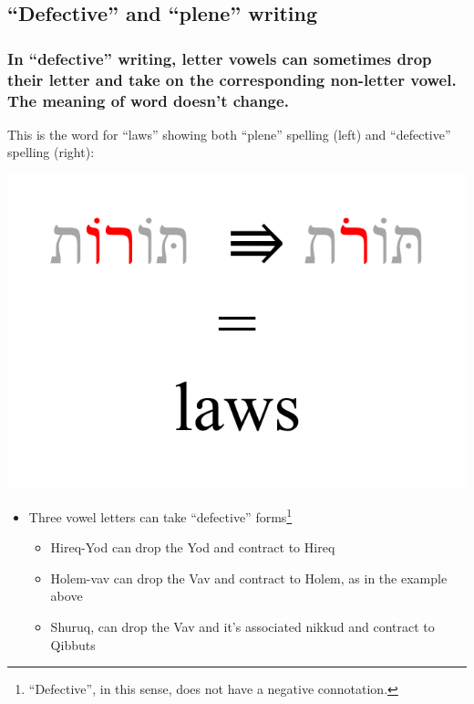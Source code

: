 \documentclass[
]{turabian-researchpaper}
\providecommand{\tightlist}{%
  \setlength{\itemsep}{0pt}\setlength{\parskip}{0pt}}
\begin{document}
\hypertarget{two_4}{%
\subsection{``Defective'' and ``plene'' writing}\label{two_4}}

\hypertarget{in-defective-writing-letter-vowels-can-sometimes-drop-their-letter-and-take-on-the-corresponding-non-letter-vowel.-the-meaning-of-word-doesnt-change.}{%
\subsubsection*{In ``defective'' writing, letter vowels can sometimes drop their letter and take on the corresponding non-letter vowel. The meaning of word doesn't change.}\label{in-defective-writing-letter-vowels-can-sometimes-drop-their-letter-and-take-on-the-corresponding-non-letter-vowel.-the-meaning-of-word-doesnt-change.}}

This is the word for ``laws'' showing both ``plene'' spelling (left) and ``defective'' spelling (right):

\begin{center}\includegraphics[width=500pt]{images/02.defective} \end{center}

\begin{itemize}
\tightlist
\item
  Three vowel letters can take ``defective'' forms\footnote{``Defective'', in this sense, does not have a negative connotation.}

  \begin{itemize}
  \tightlist
  \item
    Hireq-Yod can drop the Yod and contract to Hireq
  \item
    Holem-vav can drop the Vav and contract to Holem, as in the example above
  \item
    Shuruq, can drop the Vav and it's associated nikkud and contract to Qibbuts
  \end{itemize}
\end{itemize}
\end{document}
